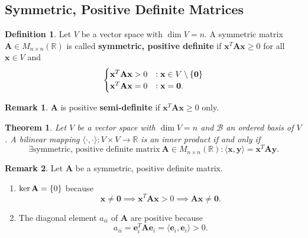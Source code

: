 \documentclass[12pt,openany]{book}
\newtheorem{theorem}{Theorem}[chapter]
\theoremstyle{definition}
\newtheorem{definition}{Definition}[chapter]
\newtheorem{remark}{Remark}[chapter]
\newcommand{\R}{\mathbb{R}}
\newcommand{\by}{\times}
\newcommand{\basis}{\mathscr{B}}
\newcommand{\inner}[1]{\langle #1\rangle}
\begin{document}
	\subsection{Symmetric, Positive Definite Matrices}
	\begin{tcolorbox}[colframe=defcolor,title={\color{white}\bf Symmetric, Positive Defintie Matrix}]
		\begin{definition}
			Let \(V\) be a vector space with \(\dim V=n\). A symmetric matrix \(\textbf{A}\in M_{n\by n}(\R)\) is called \textbf{symmetric, positive definite} if \(\textbf{x}^T\textbf{Ax}\geq 0\) for all \(\textbf{x}\in V\) and \[
			\begin{cases}
				\textbf{x}^T\textbf{Ax}>0 &:\textbf{x}\in V\setminus\set{\textbf{0}}\\
				\textbf{x}^T\textbf{Ax}=0 &:\textbf{x}=\textbf{0}.
			\end{cases}
			\]
		\end{definition}
	\end{tcolorbox}
	\begin{remark}
		\(\textbf{A}\) is positive \textbf{semi-definite} if \(\textbf{x}^T\textbf{A}\textbf{x}\geq 0 \) only.
	\end{remark}
	\vspace{8pt}
	\begin{tcolorbox}[colframe=thmcolor,title={\color{white}\bf }]
		\begin{theorem}
			Let \(V\) be a vector space with \(\dim V=n\) and \(\basis\) an ordered basis of \(V\). A bilinear mapping \(\inner{\cdot,\cdot}:V\times V\to\R\) is an inner product if and only if \[
			\exists\text{symmetric, positive definite matrix}\ \textbf{A}\in M_{n\by n}(\R):\inner{\textbf{x},\textbf{y}}=\textbf{x}^T\textbf{A}\textbf{y}.
			\]
		\end{theorem}
	\end{tcolorbox} 
	\vspace{8pt}
	\begin{remark}
		Let \(\textbf{A}\) be a symmetric, positive definite matrix.
		\begin{enumerate}[(1)]
			\item \(\ker\textbf{A}=\set{0}\) because \[
			\textbf{x}\neq \textbf{0}\implies \textbf{x}^T\textbf{Ax}>0\implies \textbf{Ax}\neq\textbf{0}.
			\]
			\item The diagonal element \(a_{ii}\) of \(\textbf{A}\) are positive because \[
			a_{ii}=\textbf{e}_i^T\textbf{A}\textbf{e}_i=\inner{\textbf{e}_i,\textbf{e}_i}> 0.
			\]
		\end{enumerate}
	\end{remark}
\end{document}
